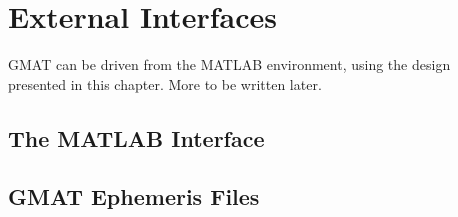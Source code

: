 \chapter{\label{chapter:ExternalInterfaces}External Interfaces}
GMAT can be driven from the MATLAB environment, using the design presented in this chapter.  More
to be written later.

\section{\label{section:MatlabInterface}The MATLAB Interface}

\section{\label{section:Ephemerides}GMAT Ephemeris Files}